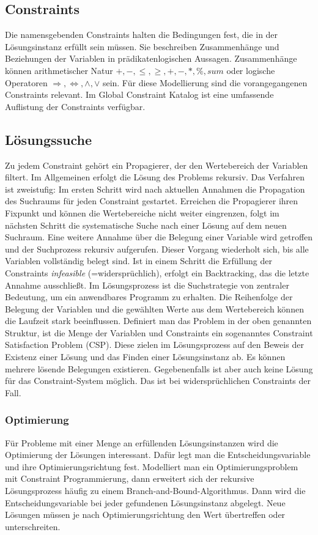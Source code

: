 \subsection{Constraints}
Die namensgebenden Constraints halten die Bedingungen fest, die in der Lösungsinstanz erfüllt sein müssen. Sie beschreiben Zusammenhänge und Beziehungen der Variablen in prädikatenlogischen Aussagen. Zusammenhänge können arithmetischer Natur $ +, -, \le, \ge, +, -, * , \%, sum$ oder logische Operatoren $\Rightarrow, \Leftrightarrow, \wedge, \vee$ sein.
Für diese Modellierung sind die vorangegangenen Constraints relevant. Im Global Constraint Katalog \cite{GlobalConstraintWeb} ist eine umfassende Auflistung der Constraints verfügbar. 
\subsection{Lösungssuche}

Zu jedem Constraint gehört ein Propagierer, der den Wertebereich der Variablen filtert. Im Allgemeinen erfolgt die Lösung des Problems rekursiv. Das Verfahren ist zweistufig: Im ersten Schritt wird nach aktuellen Annahmen die Propagation des Suchraums für jeden Constraint gestartet. Erreichen die Propagierer ihren Fixpunkt und können die Wertebereiche nicht weiter eingrenzen, folgt im nächsten Schritt die systematische Suche nach einer Lösung auf dem neuen Suchraum. Eine weitere Annahme über die Belegung einer Variable wird getroffen und der Suchprozess rekursiv aufgerufen. Dieser Vorgang wiederholt sich, bis alle Variablen vollständig belegt sind. Ist in einem Schritt die Erfüllung der Constraints \textit{infeasible} (=widersprüchlich), erfolgt ein Backtracking, das die letzte Annahme ausschließt. Im Lösungsprozess ist die Suchstrategie von zentraler Bedeutung, um ein anwendbares Programm zu erhalten. Die Reihenfolge der Belegung der Variablen und die gewählten Werte aus dem Wertebereich können die Laufzeit stark beeinflussen. \newline 
 Definiert man das Problem in der oben genannten Struktur, ist die Menge der Variablen und Constraints ein sogenanntes Constraint Satisfaction Problem (CSP). Diese zielen im Lösungsprozess auf den Beweis der Existenz einer Lösung und das Finden einer Lösungsinstanz ab. Es können mehrere lösende Belegungen existieren. Gegebenenfalls ist aber auch keine Lösung für das Constraint-System möglich. Das ist bei widersprüchlichen Constraints der Fall. 

\subsubsection{Optimierung}
Für Probleme mit einer Menge an erfüllenden Lösungsinstanzen wird die Optimierung der Lösungen interessant. Dafür legt man die Entscheidungsvariable und ihre Optimierungsrichtung fest. 
Modelliert man ein Optimierungsproblem mit Constraint Programmierung, dann erweitert sich der rekursive Lösungsprozess häufig zu einem Branch-and-Bound-Algorithmus. Dann wird die Entscheidungsvariable bei jeder gefundenen Lösungsinstanz abgelegt. Neue Lösungen müssen je nach Optimierungsrichtung den Wert übertreffen oder unterschreiten.